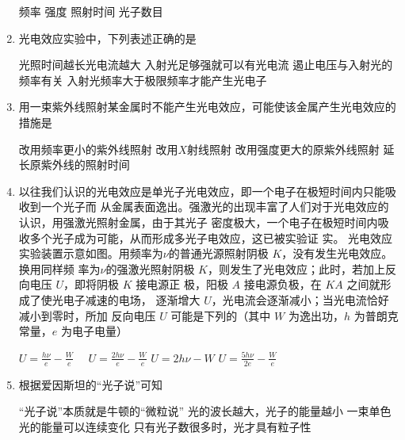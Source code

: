 \begin{enumerate}
\fourchoices
{频率}
{强度}
{照射时间}
{光子数目}




\item 
{}
光电效应实验中，下列表述正确的是  

\fourchoices
{光照时间越长光电流越大}
{入射光足够强就可以有光电流}
{遏止电压与入射光的频率有关}
{入射光频率大于极限频率才能产生光电子}



\item 
{}
用一束紫外线照射某金属时不能产生光电效应，可能使该金属产生光电效应的措施是  

\fourchoices
{改用频率更小的紫外线照射}
{改用$ X $射线照射}
{改用强度更大的原紫外线照射}
{延长原紫外线的照射时间}


\item 
{}
以往我们认识的光电效应是单光子光电效应，即一个电子在极短时间内只能吸收到一个光子而
从金属表面逸出。强激光的出现丰富了人们对于光电效应的认识，用强激光照射金属，由于其光子
密度极大，一个电子在极短时间内吸收多个光子成为可能，从而形成多光子电效应，这已被实验证
实。
光电效应实验装置示意如图。用频率为$ \nu $的普通光源照射阴极 $ K $，没有发生光电效应。换用同样频
率为$ \nu $的强激光照射阴极 $ K $，则发生了光电效应；此时，若加上反向电压 $ U $，即将阴极 $ K $ 接电源正
极，阳极 $ A $ 接电源负极，在 $ KA $ 之间就形成了使光电子减速的电场，
逐渐增大 $ U $，光电流会逐渐减小；当光电流恰好减小到零时，所加
反向电压 $ U $ 可能是下列的（其中 $ W $ 为逸出功，$ h $ 为普朗克常量，$ e $
为电子电量）  
\begin{figure}[h!]
	\centering
	
\end{figure}

\fourchoices
{$U=\frac{h \nu}{e}-\frac{W}{e} $}
{$\quad U=\frac{2 h \nu}{e}-\frac{W}{e}$}
{$U=2 h \nu-W $}
{$ U=\frac{5 h \nu}{2 e}-\frac{W}{e}$}

\item 
{}
根据爱因斯坦的“光子说”可知  

\fourchoices
{“光子说”本质就是牛顿的“微粒说”}
{光的波长越大，光子的能量越小}
{一束单色光的能量可以连续变化}
{只有光子数很多时，光才具有粒子性}



\end{enumerate}
